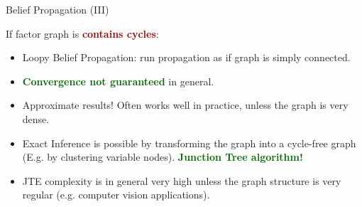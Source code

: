 \documentclass[10pt]{beamer}
\newcommand{\p}[1]{p_{_{#1}}} %
\newcommand{\noteB}[1]{\textbf{\textcolor{darkblue}{#1}}}
\newcommand{\noteR}[1]{\textbf{\textcolor{darkred}{#1}}}
\newcommand{\noteG}[1]{\textbf{\textcolor{darkgreen}{#1}}}
\newcommand{\mes}[2]{m_{#1\rightarrow#2}}
\newcommand{\Iset}[1]{\mathtt{#1}} %
\begin{document}
\begin{frame}{Belief Propagation (III)}
%

If factor graph is \noteR{contains cycles}:
\begin{itemize}
\item Loopy Belief Propagation: run propagation as if graph is simply connected.
\item \noteG{Convergence not guaranteed} in general.
\item Approximate results! Often works well in practice, unless the graph is very dense. 
\item Exact Inference is possible by transforming the graph into a cycle-free graph (E.g. by clustering variable nodes). \noteG{Junction Tree algorithm!}
\item JTE complexity is in general very high unless the graph structure is very regular (e.g. computer vision applications).
\end{itemize}

\end{frame}
\end{document}
